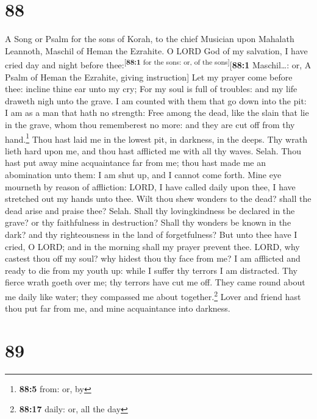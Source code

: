 \hypertarget{section-87}{%
\section{88}\label{section-87}}

A Song or Psalm for the sons of Korah, to the chief Musician upon
Mahalath Leannoth, Maschil of Heman the Ezrahite.  O LORD
God of my salvation, I have cried day and night before
thee:\textsuperscript{{[}\textbf{88:1} for the sons: or, of the
sons{]}}{[}\textbf{88:1} Maschil\ldots: or, A Psalm of Heman the
Ezrahite, giving instruction{]}  Let my prayer come before
thee: incline thine ear unto my cry;  For my soul is full
of troubles: and my life draweth nigh unto the grave.  I
am counted with them that go down into the pit: I am as a man that hath
no strength:  Free among the dead, like the slain that lie
in the grave, whom thou rememberest no more: and they are cut off from
thy hand.\footnote{\textbf{88:5} from: or, by}  Thou hast
laid me in the lowest pit, in darkness, in the deeps.  Thy
wrath lieth hard upon me, and thou hast afflicted me with all thy waves.
Selah.  Thou hast put away mine acquaintance far from me;
thou hast made me an abomination unto them: I am shut up, and I cannot
come forth.  Mine eye mourneth by reason of affliction:
LORD, I have called daily upon thee, I have stretched out my hands unto
thee.  Wilt thou shew wonders to the dead? shall the dead
arise and praise thee? Selah.  Shall thy lovingkindness
be declared in the grave? or thy faithfulness in destruction?
 Shall thy wonders be known in the dark? and thy
righteousness in the land of forgetfulness?  But unto
thee have I cried, O LORD; and in the morning shall my prayer prevent
thee.  LORD, why castest thou off my soul? why hidest
thou thy face from me?  I am afflicted and ready to die
from my youth up: while I suffer thy terrors I am distracted.
 Thy fierce wrath goeth over me; thy terrors have cut me
off.  They came round about me daily like water; they
compassed me about together.\footnote{\textbf{88:17} daily: or, all the
  day}  Lover and friend hast thou put far from me, and
mine acquaintance into darkness.

\hypertarget{section-88}{%
\section{89}\label{section-88}}

